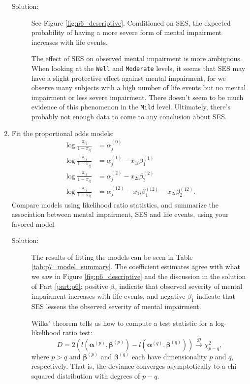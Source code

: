 \documentclass[letterpaper,11pt]{article}
\begin{document}
\begin{enumerate}
  \begin{description}
  \item[Solution:] See Figure \ref{fig:p6_descriptive}. Conditioned on SES, the
    expected probability of having a more severe form of mental impairment
    increases with life events.

    The effect of SES on observed mental impairment is more ambiguous. When
    looking at the \texttt{Well} and \texttt{Moderate} levels, it seems that SES
    may have a slight protective effect against mental impairment, for we
    observe many subjects with a high number of life events but no mental
    impairment or less severe impairment. There doesn't seem to be much evidence
    of this phenomenon in the \texttt{Mild} level. Ultimately, there's probably
    not enough data to come to any conclusion about SES.
  \end{description}
\item \label{part:p7} Fit the proportional odds models:
  \begin{align}
    \log\frac{\pi_{ij}}{1 - \pi_{ij}}
    &= \alpha_j^{(0)}
      \label{eqn:p7_model_1} \\
    \log\frac{\pi_{ij}}{1 - \pi_{ij}}
    &= \alpha_j^{(1)} - x_{1i}\beta_1^{(1)}
      \label{eqn:p7_model_2} \\
    \log\frac{\pi_{ij}}{1 - \pi_{ij}}
    &=  \alpha_j^{(2)} - x_{2i}\beta_2^{(2)}
      \label{eqn:p7_model_3} \\
    \log\frac{\pi_{ij}}{1 - \pi_{ij}}
    &= \alpha_j^{(12)} - x_{1i}\beta_1^{(12)} - x_{2i}\beta_2^{(12)}.
      \label{eqn:p7_model_4}
  \end{align}
  Compare models using likelihood ratio statistics, and summarize the
  association between mental impairment, SES and life events, using your favored
  model.

  
  
  \begin{description}
  \item[Solution:] The results of fitting the models can be seen in Table
    \ref{tab:p7_model_summary}. The coefficient estimates agree with what we saw
    in Figure \ref{fig:p6_descriptive} and the discussion in the solution of
    Part \ref{part:p6}: positive $\beta_2$ indicate that observed severity of
    mental impairment increases with life events, and negative $\beta_1$
    indicate that SES lessens the observed severity of mental impairment.

    Wilks' theorem tells us how to compute a test statistic for a log-likelihood
    ratio test:
    \begin{equation}
      D = 2\left(
        l\left(\bm\alpha^{(p)}, \bm\beta^{(p)}\right) -
        l\left(\bm\alpha^{(q)}, \bm\beta^{(q)}\right)        
      \right) \xrightarrow{\mathcal{D}} \chi^2_{p - q},
      \label{eqn:p7_deviance}
    \end{equation}
    where $p > q$ and $\bm\beta^{(p)}$ and $\bm\beta^{(q)}$ each have
    dimensionality $p$ and $q$, respectively. That is, the deviance converges
    asymptotically to a chi-squared distribution with degrees of $p-q$.


\end{description}
\end{enumerate}
\end{document}

